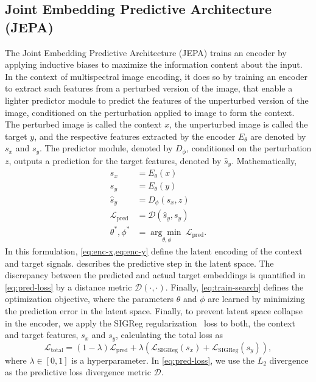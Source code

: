 \subsection{Joint Embedding Predictive Architecture (JEPA)}
\label{sec:methodology_jepa}

The Joint Embedding Predictive Architecture (JEPA) trains an encoder by applying inductive biases to maximize the information content about the input. In the context of multispectral image encoding, it does so by training an encoder to extract such features from a perturbed version of the image, that enable a lighter predictor module to predict the features of the unperturbed version of the image, conditioned on the perturbation applied to image to form the context. The perturbed image is called the context \( x \), the unperturbed image is called the target \( y \), and the respective features extracted by the encoder \( E_\theta \) are denoted by \( s_x \) and \( s_y \). The predictor module, denoted by \( D_\phi \), conditioned on the perturbation \( z \), outputs a prediction for the target features, denoted by \( \hat{s}_y \). Mathematically,
\begin{align}
	s_x                       & = E_\theta(x)           \label{eq:enc-x}                                                  \\
	s_y                       & = E_\theta(y)           \label{eq:enc-y}                                                  \\
	\hat{s}_y                 & = D_\phi(s_x, z)        \label{eq:pred-y}                                                 \\
	\mathcal{L}_\mathrm{pred} & = \mathcal{D}(\hat{s}_y, s_y) \label{eq:pred-loss}                                        \\
	\theta^\ast, \phi^\ast    & = \underset{\theta, \phi}{\arg\min\ }{\mathcal{L}_\mathrm{pred}}. \label{eq:train-search}
\end{align}
In this formulation, \cref{eq:enc-x,eq:enc-y} define the latent encoding of the context and target signals.  describes the predictive step in the latent space. The discrepancy between the predicted and actual target embeddings is quantified in \cref{eq:pred-loss} by a distance metric $\mathcal{D}(\cdot, \cdot)$. Finally, \cref{eq:train-search} defines the optimization objective, where the parameters $\theta$ and $\phi$ are learned by minimizing the prediction error in the latent space. Finally, to prevent latent space collapse in the encoder, we apply the SIGReg regularization~\cite{balestriero2025lejepaprovablescalableselfsupervised} loss to both, the context and target features, \( s_x \) and \( s_y \), calculating the total loss as
\begin{equation}
	\mathcal{L}_\mathrm{total} = (1 - \lambda) \mathcal{L}_\mathrm{pred} + \lambda (\mathcal{L}_\mathrm{SIGReg}(s_x) + \mathcal{L}_\mathrm{SIGReg}(s_y)),
	\label{eq:combined-loss}
\end{equation}
where \( \lambda \in [0, 1] \) is a hyperparameter. In \cref{eq:pred-loss}, we use the $L_2$ divergence as the predictive loss divergence metric $\mathcal{D}$.

